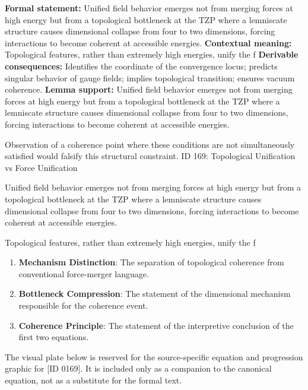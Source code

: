 \begingroup\footnotesize\setlength{\emergencystretch}{3em}\sloppy
\textbf{Formal statement:} Unified field behavior emerges not from merging forces at high energy but from a topological bottleneck at the TZP where a lemniscate structure causes dimensional collapse from four to two dimensions, forcing interactions to become coherent at accessible energies.  
\textbf{Contextual meaning:} Topological features, rather than extremely high energies, unify the f
\textbf{Derivable consequences:} Identifies the coordinate of the convergence locus; predicts singular behavior of gauge fields; implies topological transition; ensures vacuum coherence.
\textbf{Lemma support:} Unified field behavior emerges not from merging forces at high energy but from a topological bottleneck at the TZP where a lemniscate structure causes dimensional collapse from four to two dimensions, forcing interactions to become coherent at accessible energies.  \par
\endgroup

Observation of a coherence point where these conditions are not simultaneously satisfied would falsify this structural constraint. ID 169: Topological Unification vs Force Unification

Unified field behavior emerges not from merging forces at high energy but from a topological bottleneck at the TZP where a lemniscate structure causes dimensional collapse from four to two dimensions, forcing interactions to become coherent at accessible energies.  

Topological features, rather than extremely high energies, unify the f
\endgroup

\begin{enumerate}[leftmargin=1.6em,itemsep=6pt,topsep=4pt]
\item \textbf{Mechanism Distinction}: The separation of topological coherence from conventional force-merger language.
\item \textbf{Bottleneck Compression}: The statement of the dimensional mechanism responsible for the coherence event.
\item \textbf{Coherence Principle}: The statement of the interpretive conclusion of the first two equations.
\end{enumerate}

\begingroup\footnotesize\sloppy
The visual plate below is reserved for the source-specific equation and progression graphic for [ID 0169]. It is included only as a companion to the canonical equation, not as a substitute for the formal text.
\par\endgroup
\ifTZPDarkEdition
{}
\fi

